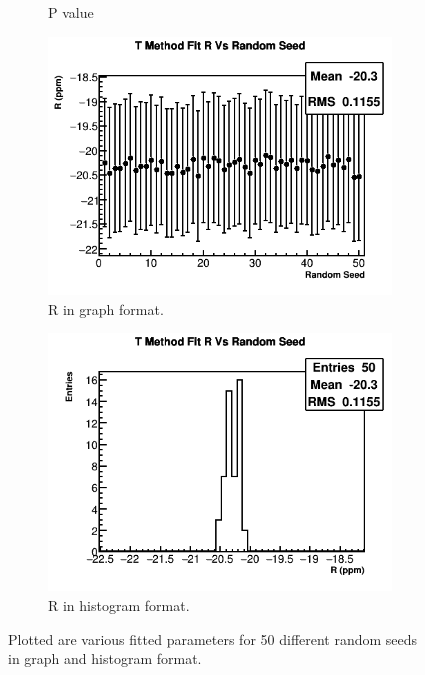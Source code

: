 \begin{figure}[]
\begin{subfigure}[t]{0.45\textwidth}
		    \caption{P value}
	    \end{subfigure}%
	   	\vspace{4mm}
	    \begin{subfigure}[t]{0.45\textwidth}
		    \centering
			\includegraphics[width=\textwidth]{TMethod_R_Vs_Iter_Canv}
		    \caption{R in graph format.}
	    \end{subfigure}
	    \hspace{4mm}
	    \begin{subfigure}[t]{0.45\textwidth}
		    \centering
			\includegraphics[width=\textwidth]{TMethod_R_Vs_Iter_Canv_hist}
		    \caption{R in histogram format.}
	    \end{subfigure}%
	\caption[TMethodRandomSeedsPars1]{Plotted are various fitted parameters for 50 different random seeds in graph and histogram format.}
	\label{fig:TMethodRandomSeedsPars1}
	\end{figure}

